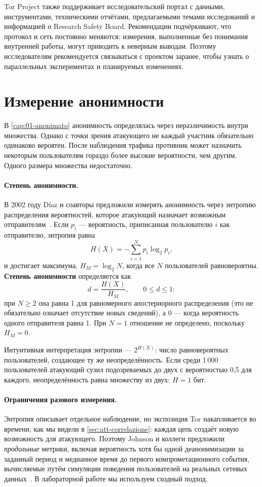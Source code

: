 Tor Project также поддерживает исследовательский портал с данными, инструментами, техническими отчётами, предлагаемыми темами исследований и информацией о Research Safety Board. Рекомендации подчёркивают, что протокол и сеть постоянно меняются: измерения, выполненные без понимания внутренней работы, могут приводить к неверным выводам. Поэтому исследователям рекомендуется связываться с проектом заранее, чтобы узнать о параллельных экспериментах и планируемых изменениях.

\section{Измерение анонимности}\label{sec:ric-metriche}

В \cref{cap:01-anonimato} анонимность определялась через неразличимость внутри множества. Однако с точки зрения атакующего не каждый участник обязательно одинаково вероятен. После наблюдения трафика противник может назначить некоторым пользователям гораздо более высокие вероятности, чем другим. Одного размера множества недостаточно.

\paragraph{Степень анонимности.} В 2002 году Díaz и соавторы предложили измерять анонимность через энтропию распределения вероятностей, которое атакующий назначает возможным отправителям~\cite{diaz2002measuring}. Если $p_i$ — вероятность, приписанная пользователю $i$ как отправителю, энтропия равна
\[
H(X) = -\sum_{i=1}^{N} p_i \log_2 p_i,
\]
и достигает максимума, $H_M = \log_2 N$, когда все $N$ пользователей равновероятны. \textbf{Степень анонимности} определяется как
\[
d = \frac{H(X)}{H_M}, \qquad 0 \le d \le 1:
\]
при $N\ge 2$ она равна 1 для равномерного апостериорного распределения (это не обязательно означает отсутствие новых сведений), а 0 — когда вероятность одного отправителя равна 1. При $N=1$ отношение не определено, поскольку $H_M=0$.

Интуитивная интерпретация энтропии — $2^{H(X)}$: число равновероятных пользователей, создающее ту же неопределённость. Если среди 1\,000 пользователей атакующий сузил подозреваемых до двух с вероятностью 0,5 для каждого, неопределённость равна множеству из двух: $H = 1$ бит.

\paragraph{Ограничения разового измерения.} Энтропия описывает отдельное наблюдение, но экспозиция Tor накапливается во времени, как мы видели в \cref{sec:att-correlazione}: каждая цепь создаёт новую возможность для атакующего. Поэтому Johnson и коллеги предложили \emph{продольные} метрики, включая вероятность хотя бы одной деанонимизации за заданный период и медианное время до первого компрометационного события, вычисляемые путём симуляции поведения пользователей на реальных сетевых данных~\cite{johnson2013users}. В лабораторной работе мы используем сходный подход.

